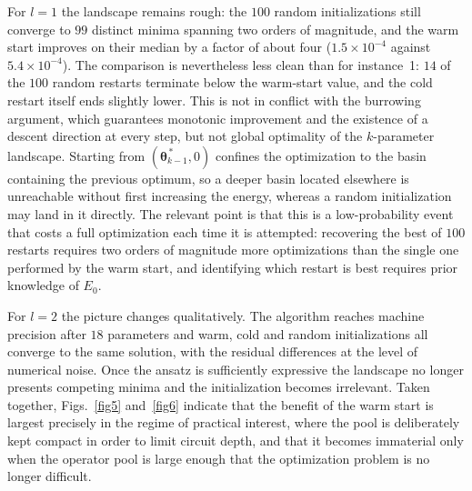 For $l=1$ the landscape remains rough: the $100$ random initializations still
converge to $99$ distinct minima spanning two orders of magnitude, and the warm
start improves on their median by a factor of about four ($1.5\times10^{-4}$
against $5.4\times10^{-4}$). The comparison is nevertheless less clean than for
instance~1: $14$ of the $100$ random restarts terminate below the warm-start
value, and the cold restart itself ends slightly lower. This is not in conflict
with the burrowing argument, which guarantees monotonic improvement and the
existence of a descent direction at every step, but not global optimality of
the $k$-parameter landscape. Starting from
$(\boldsymbol{\theta}_{k-1}^{\,*},0)$ confines the optimization to the basin
containing the previous optimum, so a deeper basin located elsewhere is
unreachable without first increasing the energy, whereas a random
initialization may land in it directly. The relevant point is that this is a
low-probability event that costs a full optimization each time it is attempted:
recovering the best of $100$ restarts requires two orders of magnitude more
optimizations than the single one performed by the warm start, and identifying
which restart is best requires prior knowledge of $E_0$.

For $l=2$ the picture changes qualitatively. The algorithm reaches machine
precision after $18$ parameters and warm, cold and random initializations all
converge to the same solution, with the residual differences at the level of
numerical noise. Once the ansatz is sufficiently expressive the landscape no
longer presents competing minima and the initialization becomes irrelevant.
Taken together, Figs.~\ref{fig5} and~\ref{fig6} indicate that the benefit of the
warm start is largest precisely in the regime of practical interest, where the
pool is deliberately kept compact in order to limit circuit depth, and that it
becomes immaterial only when the operator pool is large enough that the
optimization problem is no longer difficult.
